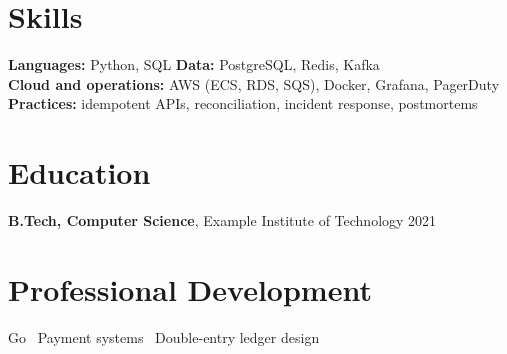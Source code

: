 \documentclass[10.5pt,a4paper]{article}
\begin{document}
\section{Skills}
\textbf{Languages:} Python, SQL \quad \textbf{Data:} PostgreSQL, Redis, Kafka\\
\textbf{Cloud and operations:} AWS (ECS, RDS, SQS), Docker, Grafana, PagerDuty\\
\textbf{Practices:} idempotent APIs, reconciliation, incident response, postmortems

\section{Education}
\textbf{B.Tech, Computer Science}, Example Institute of Technology \hfill 2021

\section{Professional Development}
Go \textperiodcentered\ Payment systems \textperiodcentered\ Double-entry ledger design
\end{document}
